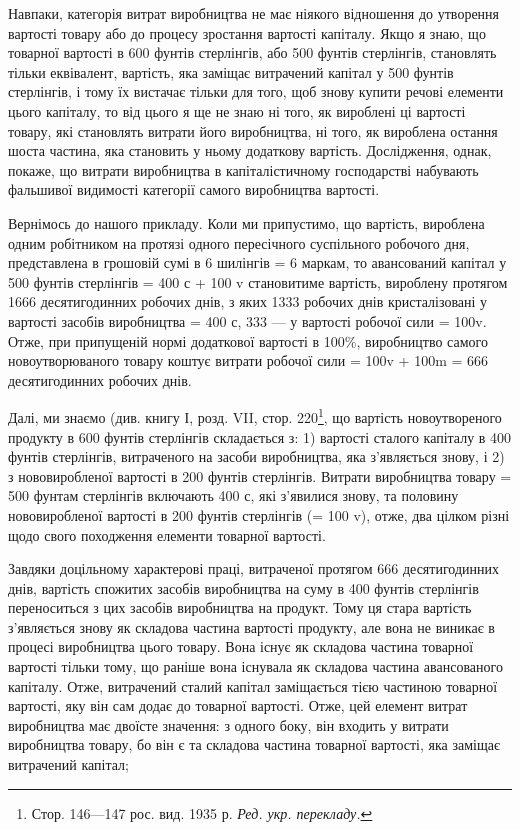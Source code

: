 
Навпаки, категорія витрат виробництва не має ніякого відношення
до утворення вартості товару або до процесу зростання
вартості капіталу. Якщо я знаю, що  товарної вартості
в 600 фунтів стерлінгів, або 500 фунтів стерлінгів, становлять
тільки еквівалент, вартість, яка заміщає витрачений капітал
у 500 фунтів стерлінгів, і тому їх вистачає тільки для того, щоб
знову купити речові елементи цього капіталу, то від цього
я ще не знаю ні того, як вироблені ці   вартості товару, які
становлять витрати його виробництва, ні того, як вироблена
остання шоста частина, яка становить у ньому додаткову вартість.
Дослідження, однак, покаже, що витрати виробництва в капіталістичному
господарстві набувають фальшивої видимості категорії
самого виробництва вартості.

Вернімось до нашого прикладу. Коли ми припустимо, що вартість,
вироблена одним робітником на протязі одного пересічного
суспільного робочого дня, представлена в грошовій сумі
в 6 шилінгів = 6 маркам, то авансований капітал у 500 фунтів
стерлінгів = 400 с + 100 v становитиме вартість, вироблену протягом
1666 десятигодинних робочих днів, з яких 1333 робочих
днів кристалізовані у вартості засобів виробництва = 400 с,
333  — у вартості робочої сили = 100v. Отже, при припущеній
нормі додаткової вартості в 100\%, виробництво самого новоутворюваного
товару коштує витрати робочої сили = 100v +
100m = 666  десятигодинних робочих днів.

Далі, ми знаємо (див. книгу І, розд. VII, стор. 220\footnote*{Стор. 146—147 рос. вид. 1935 р. \emph{Ред. укр. перекладу.}}, що вартість
новоутвореного продукту в 600 фунтів стерлінгів складається
з: 1) вартості сталого капіталу в 400 фунтів стерлінгів,
витраченого на засоби виробництва, яка з’являється знову, і
2) з нововиробленої вартості в 200 фунтів стерлінгів. Витрати
виробництва товару = 500 фунтам стерлінгів включають 400 с,
які з’явилися знову, та половину нововиробленої вартості в
200 фунтів стерлінгів (= 100 v), отже, два цілком різні щодо
свого походження елементи товарної вартості.

Завдяки доцільному характерові праці, витраченої протягом
666  десятигодинних днів, вартість спожитих засобів виробництва
на суму в 400 фунтів стерлінгів переноситься з цих
засобів виробництва на продукт. Тому ця стара вартість з’являється
знову як складова частина вартості продукту, але вона
не виникає в процесі виробництва цього товару. Вона існує як
складова частина товарної вартості тільки тому, що раніше вона
існувала як складова частина авансованого капіталу. Отже, витрачений
сталий капітал заміщається тією частиною товарної
вартості, яку він сам додає до товарної вартості. Отже, цей
елемент витрат виробництва має двоїсте значення: з одного боку,
він входить у витрати виробництва товару, бо він є та складова
частина товарної вартості, яка заміщає витрачений капітал;
\parbreak{}  %

